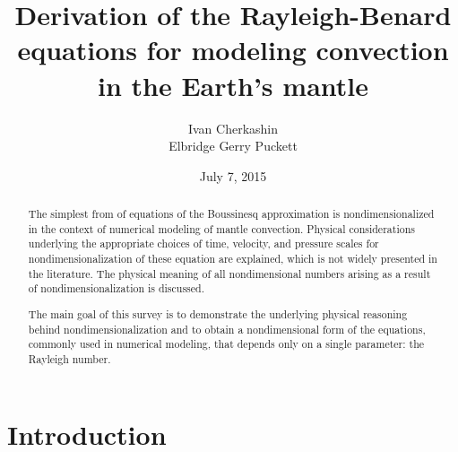 \documentclass[
12pt, %
a4paper, %
oneside, %
headinclude,footinclude, %
BCOR5mm, %
]{scrartcl}
\renewcommand{\today}{July 7, 2015}
\begin{document}
\title{Derivation of the Rayleigh-Benard equations for modeling convection in the Earth's mantle}


\author{Ivan Cherkashin \\ Elbridge Gerry Puckett}




\date{\today}

\maketitle

\begin{abstract}
The simplest from of equations of the Boussinesq approximation is nondimensionalized in the context of numerical modeling of mantle convection. Physical considerations underlying the appropriate choices of time, velocity, and pressure scales for nondimensionalization of these equation are explained, which is not widely presented in the literature. The physical meaning of all nondimensional numbers arising as a result of nondimensionalization is discussed.

The main goal of this survey is to demonstrate the underlying physical reasoning behind nondimensionalization and to obtain a nondimensional form of the equations, commonly used in numerical modeling, that depends only on a single parameter: the Rayleigh number.
\end{abstract}

\tableofcontents

\section*{Introduction}
\end{document}
